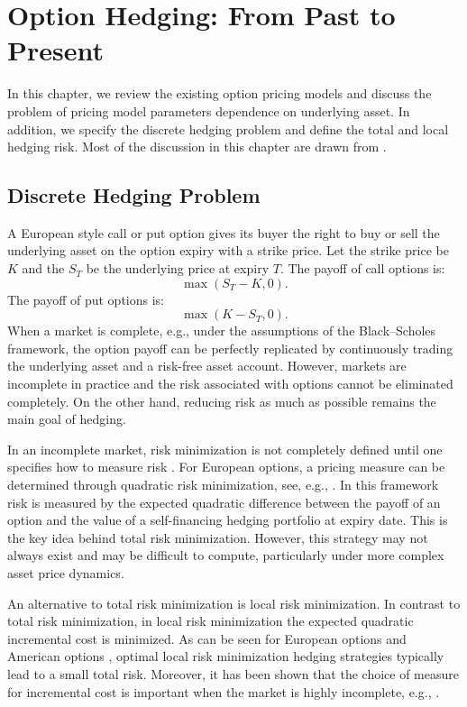 \documentclass[letterpaper,12pt,titlepage,oneside,final]{book}
\numberwithin{equation}{section}
\theoremstyle{definition}
\begin{document}
\chapter{Option Hedging: From Past to Present}
\label{sec:Background} 
In this chapter, we review the existing option pricing models and discuss the problem of pricing model parameters dependence on underlying asset.  In addition, we specify the discrete hedging problem and define the total and local hedging risk. Most of the discussion in this chapter are drawn from \cite{shreve2004stochastic,heston1993closed,bartlett2006hedging,hagan2017bartlett,hagan2002managing}. 




\section{Discrete Hedging Problem}
\label{sec:DiscreteHedgingCriteria}
 A European style call or put option gives its buyer the right to buy or sell the underlying asset on the option expiry with a strike price. Let the strike price be $K$ and  the $S_T$ be the underlying price at expiry $T$. The payoff of call options is:
\[
\max(S_T-K,0).
\]
The payoff of put options is:
\[
\max(K-S_T,0).
\]
When a market is complete, e.g., under the assumptions of the Black–Scholes framework, the option payoff can be perfectly replicated by continuously trading the underlying asset and a risk-free asset account. However, markets are incomplete in practice and
the risk associated with options cannot be eliminated completely. On the other hand, reducing risk as much as possible remains the main goal of hedging.

In an incomplete market, risk minimization is not completely defined until one specifies how to measure risk \cite{follmer1999quantile,follmer2000efficient,schweizerguided,el1995dynamic}. For European options, a pricing measure
can be determined through quadratic risk minimization, see, e.g., \cite{schweizer1995variance,schweizerguided,coleman2007total}. In this framework risk is measured by the expected quadratic difference between the payoff of an option and the value of a self-financing hedging portfolio at expiry date. This is the key idea behind total risk minimization. However, this strategy may not always exist and may be difficult to compute, particularly under more complex asset price dynamics\cite{coleman2003discrete,coleman2007discrete}.

An alternative to total risk minimization is local risk minimization. In contrast to total risk minimization, in local risk minimization the expected quadratic incremental cost is minimized.
As can be seen for European options \cite{coleman2003discrete} and American options \cite{coleman2007discrete} , optimal local risk minimization hedging strategies typically lead to a small total risk. Moreover, it has been shown that the choice of measure for incremental cost is important when the market is highly incomplete, e.g., \cite{coleman2003discrete,coleman2007discrete}. 
\end{document}
